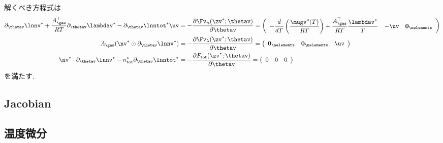 解くべき方程式は
\begin{align}
\label{eq:update_tce_1}
    \partial_{\thetav} {\lnnv}^\ast + \frac{A_\gas^\top }{RT} \partial_{\thetav} {\lambdav}^\ast - \partial_{\thetav} \lnntot^\ast \uv 
    &= - \dfrac{\partial \Fv_n(\zv^\ast; \thetav)}{\partial \thetav} 
    = \left(
\begin{array}{ccc}
- \dfrac{d}{d T} \left( \dfrac{\mugv^\circ (T)}{R T} \right) + \dfrac{A_\gas^\top }{R T} \dfrac{\lambdav^\ast}{T} & - {\uv} & \boldsymbol{0}_\nelements\\
\end{array}
\right)
    \\
\label{eq:update_tce_2}
    A_\gas (\nv^\ast \odot \partial_{\thetav} {\lnnv}^\ast) 
    &= - \dfrac{\partial \Fv_\lambda(\zv^\ast; \thetav)}{\partial \thetav} 
    = \left(
\begin{array}{ccc}
\boldsymbol{0}_\nelements & \boldsymbol{0}_\nelements & \uv\\
\end{array}
\right)
    \\
\label{eq:update_tce_3}
    \nv^\ast \cdot \partial_{\thetav} {\lnnv}^\ast  - n_\mathrm{tot}^\ast \partial_{\thetav} \lnntot^\ast 
    &= - \dfrac{\partial F_\mathrm{tot}(\zv^\ast; \thetav)}{\partial \thetav}
    =  \left(
\begin{array}{ccc}
0 & 0 & 0 \\
\end{array}
\right)
\end{align}
を満たす. 




\subsection{Jacobian}

\subsection*{温度微分}

